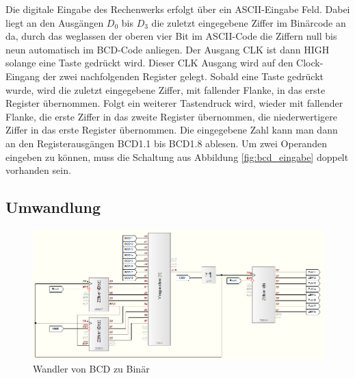 \documentclass[a4paper,12pt,fleqn,oneside]{article}
\begin{document}
		\noindent
		Die digitale Eingabe des Rechenwerks erfolgt über ein ASCII-Eingabe Feld. Dabei liegt an den Ausgängen $D_{0}$ 
		bis $D_{3}$ die zuletzt eingegebene Ziffer im Binärcode an da, durch das weglassen der oberen vier Bit im 
		ASCII-Code die Ziffern null bis neun automatisch im BCD-Code anliegen. Der Ausgang CLK ist dann HIGH solange eine Taste 
		gedrückt wird. Dieser CLK Ausgang wird auf den Clock-Eingang der zwei nachfolgenden Register gelegt. Sobald eine Taste 
		gedrückt wurde, wird die zuletzt eingegebene Ziffer, mit fallender Flanke, in das erste Register übernommen. Folgt ein 
		weiterer Tastendruck wird, wieder mit fallender Flanke, die erste Ziffer in das zweite Register übernommen, die 
		niederwertigere Ziffer in das erste Register übernommen. Die eingegebene Zahl kann man dann an den Registerausgängen 
		BCD1.1 bis BCD1.8 ablesen. Um zwei Operanden eingeben zu können, muss die Schaltung aus Abbildung \ref{fig:bcd_eingabe} 
		doppelt vorhanden sein.


	

\newpage
	\subsection{Umwandlung}
		\begin{figure}[h]
			\center
			\includegraphics[width=1.0\textwidth]{wandler_dezimal_binaer}
			\caption{Wandler von BCD zu Binär}
			\label{fig:wandler_dezimal_binaer}
		\end{figure}
	
\end{document}
